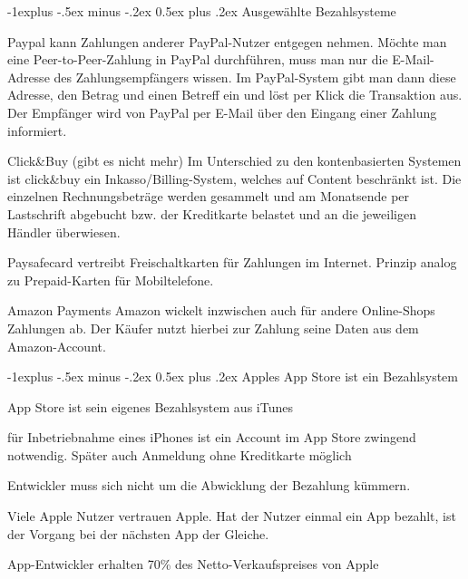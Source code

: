 \documentclass[a4paper, 8pt]{article}
\makeatletter
\renewcommand{\subsection}{\@startsection{subsection}{2}{0mm}%
                                {-1explus -.5ex minus -.2ex}%
                                {0.5ex plus .2ex}%
                                {\normalfont\normalsize\bfseries}}
\makeatother
\begin{document}
\begin{multicols*}{2}
  \subsection{Ausgewählte Bezahlsysteme}
  \begin{description*}
    \item[Paypal] kann Zahlungen anderer PayPal-Nutzer entgegen nehmen. Möchte man eine  Peer-to-Peer-Zahlung in PayPal durchführen, muss man nur die E-Mail-Adresse des Zahlungsempfängers wissen. Im PayPal-System gibt man dann diese Adresse, den Betrag und einen Betreff ein und löst per Klick die Transaktion aus. Der Empfänger wird von PayPal per E-Mail über den Eingang einer Zahlung informiert.
    \item[Click\&Buy] (gibt es nicht mehr) Im Unterschied zu den kontenbasierten Systemen ist click\&buy ein Inkasso/Billing-System, welches auf Content beschränkt ist. Die einzelnen Rechnungsbeträge werden gesammelt und am Monatsende per Lastschrift abgebucht bzw. der Kreditkarte belastet und an die jeweiligen Händler überwiesen.
    \item[Paysafecard] vertreibt Freischaltkarten für Zahlungen im Internet. Prinzip analog zu Prepaid-Karten für Mobiltelefone.
    \item[Amazon Payments] Amazon wickelt inzwischen auch für andere Online-Shops Zahlungen ab. Der Käufer nutzt hierbei zur Zahlung seine Daten aus dem Amazon-Account.
  \end{description*}

  \columnbreak
  \subsection{Apples App Store ist ein Bezahlsystem}
  \begin{itemize*}
    \item App Store ist sein eigenes Bezahlsystem aus iTunes
    \item für Inbetriebnahme eines iPhones ist ein Account im App Store zwingend notwendig. Später auch Anmeldung ohne Kreditkarte möglich
    \item Entwickler muss sich nicht um die Abwicklung der Bezahlung kümmern.
    \item Viele Apple Nutzer vertrauen Apple. Hat der Nutzer einmal ein App bezahlt, ist der Vorgang bei der nächsten App der Gleiche.
    \item App-Entwickler erhalten 70\% des Netto-Verkaufspreises von Apple
  \end{itemize*}


\end{multicols*}
\end{document}

